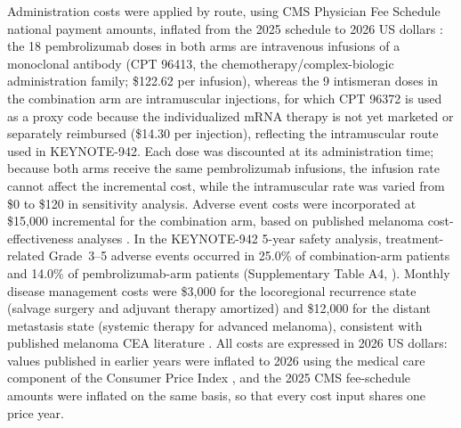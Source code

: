 \documentclass[12pt,a4paper]{article}
\begin{document}
Administration costs were applied by route, using CMS Physician Fee Schedule national payment amounts, inflated from the 2025 schedule to 2026 US dollars \cite{cms2025}: the 18 \mbox{pembrolizumab} doses in both arms are intravenous infusions of a monoclonal antibody (CPT 96413, the chemotherapy/complex-biologic administration family; \$122.62 per infusion), whereas the 9 intismeran doses in the combination arm are intramuscular injections, for which CPT 96372 is used as a proxy code because the individualized mRNA therapy is not yet marketed or separately reimbursed (\$14.30 per injection), reflecting the intramuscular route used in \mbox{KEYNOTE-942}. Each dose was discounted at its administration time; because both arms receive the same pembrolizumab infusions, the infusion rate cannot affect the incremental cost, while the intramuscular rate was varied from \$0 to \$120 in sensitivity analysis. Adverse event costs were incorporated at \$15,000 incremental for the combination arm, based on published melanoma cost-effectiveness analyses \cite{bensimon2019,zhang2023}. In the \mbox{KEYNOTE-942} 5-year safety analysis, treatment-related Grade~3--5 adverse events occurred in 25.0\% of combination-arm patients and 14.0\% of \mbox{pembrolizumab}-arm patients (Supplementary Table A4, \cite{khattak2026}). Monthly disease management costs were \$3,000 for the locoregional recurrence state (salvage surgery and adjuvant therapy amortized) and \$12,000 for the distant metastasis state (systemic therapy for advanced melanoma), consistent with published melanoma CEA literature \cite{bensimon2019,zhang2023}. All costs are expressed in 2026 US dollars: values published in earlier years were inflated to 2026 using the medical care component of the Consumer Price Index \cite{bls2025}, and the 2025 CMS fee-schedule amounts were inflated on the same basis, so that every cost input shares one price year.
\end{document}
